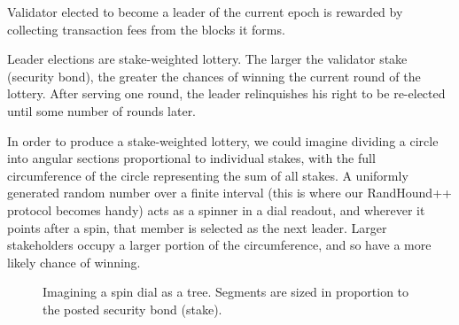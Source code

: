 \documentclass[a4paper, 10pt, conference]{ieeeconf}
\begin{document}
Validator elected to become a leader of the current epoch is rewarded by collecting transaction fees from the blocks it forms.

Leader elections are stake-weighted lottery. The larger the validator stake (security bond), the greater the chances of winning the current round of the lottery. After serving one round, the leader relinquishes his right to be re-elected until some number of rounds later.

In order to produce a stake-weighted lottery, we could imagine dividing a circle into angular sections proportional to individual stakes, with the full circumference of the circle representing the sum of all stakes. A uniformly generated random number over a finite interval (this is where our RandHound++ protocol becomes handy) acts as a spinner in a dial readout, and wherever it points after a spin, that member is selected as the next leader. Larger stakeholders occupy a larger portion of the circumference, and so have a more likely chance of winning.

\begin{figure}[h!]
\centering

%

\bigskip

%

\caption{Imagining a spin dial as a tree. Segments
are sized in proportion to the posted security bond (stake).}
  \label{fig:spinner}
\end{figure}
\end{document}

